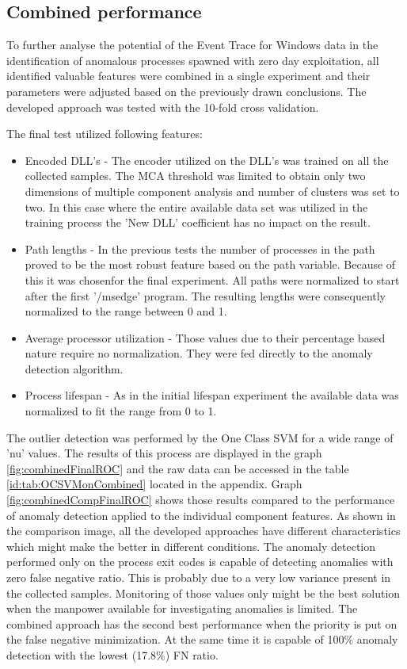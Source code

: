 \documentclass[a4paper,twoside,12pt]{book}
\begin{document}
\subsection{Combined performance}

To further analyse the potential of the Event Trace for Windows data in the identification of
anomalous processes spawned with zero day exploitation, all identified valuable features were
combined in a single experiment and their parameters were adjusted based on the previously drawn 
conclusions. The developed approach was tested with the 10-fold cross validation.

The final test utilized following features:
\begin{itemize}
	\item Encoded DLL's - The encoder utilized on the DLL's was trained on all the collected samples. The MCA 
	threshold was limited to obtain only two dimensions of multiple component analysis and number of clusters was set 
	to two. In this case where the entire available data set was utilized in the training process the 'New DLL'
	coefficient has no impact on the result.  
	\item Path lengths - In the previous tests the number of processes in the path proved to be the most robust feature
	based on the path variable. Because of this it was chosenfor the final experiment. All paths were normalized to start
	after the first '/msedge' program. The resulting lengths were consequently normalized to the range between 0 and 1.
	\item Average processor utilization - Those values due to their percentage based nature require no normalization. They 
	were fed directly to the anomaly detection algorithm. 
	\item Process lifespan - As in the initial lifespan experiment the available data was normalized to fit the range from 0 to 1.
\end{itemize}

The outlier detection was performed by the One Class SVM for a wide range of 'nu' values. The results of 
this process are displayed in the graph \ref{fig:combinedFinalROC} and the raw data can be accessed in the table 
\ref{id:tab:OCSVMonCombined} located in the appendix. Graph \ref{fig:combinedCompFinalROC} shows those results compared to 
the performance of anomaly detection applied to the individual component features. As shown in the comparison image, all the 
developed approaches have different characteristics which might make the better in different conditions. The anomaly detection
performed only on the process exit codes is capable of detecting anomalies with zero false negative ratio. This is probably
due to a very low variance present in the collected samples. Monitoring of those values only might be the best solution when
the manpower available for investigating anomalies is limited. The combined approach has the second best performance when
the priority is put on the false negative minimization. At the same time it is capable of 100\% anomaly detection with the lowest
(17.8\%) FN ratio.
\end{document}
